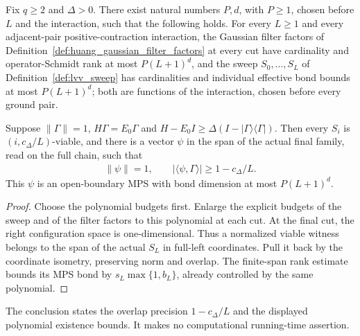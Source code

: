 \begin{theorem}
    \label{thm:lvv_uniform_successive_approximation}
    \leanok
    Fix $q\ge2$ and $\Delta>0$. There exist natural numbers $P,d$, with $P\ge1$,
    chosen before $L$ and the interaction, such that the following holds.
    For every $L\ge1$ and every adjacent-pair positive-contraction interaction,
    the Gaussian filter factors of
    Definition~\ref{def:huang_gaussian_filter_factors} at every cut have
    cardinality and operator-Schmidt rank at most $P(L+1)^d$, and the sweep
    $S_0,\ldots,S_L$ of Definition~\ref{def:lvv_sweep} has cardinalities and
    individual effective bond bounds at most $P(L+1)^d$; both are functions
    of the interaction, chosen before every ground pair.

    Suppose $\|\Gamma\|=1$, $H\Gamma=E_0\Gamma$ and
    $H-E_0I\ge\Delta(I-|\Gamma\rangle\langle\Gamma|)$. Then every $S_i$ is
    $(i,c_\Delta/L)$-viable, and there is a vector $\psi$ in the span of the
    actual final family, read on the full chain, such that
    \begin{align}
        \|\psi\|=1,\qquad
        |\langle\psi,\Gamma\rangle|\ge1-c_\Delta/L.
    \end{align}
    This $\psi$ is an open-boundary MPS with bond dimension at most $P(L+1)^d$.
\end{theorem}
\begin{proof}
    \leanok
    Choose the polynomial budgets first. Enlarge the explicit budgets of the
    sweep and of the filter factors to this polynomial at each cut.
    At the final cut, the right configuration space is one-dimensional. Thus
    a normalized viable witness belongs to the span of the actual $S_L$ in
    full-left coordinates. Pull it back by the coordinate isometry, preserving
    norm and overlap. The finite-span rank estimate bounds its MPS bond by
    $s_L\max\{1,b_L\}$, already controlled by the same polynomial.
\end{proof}

The conclusion states the overlap precision $1-c_\Delta/L$ and the displayed
polynomial existence bounds. It makes no computational running-time assertion.
